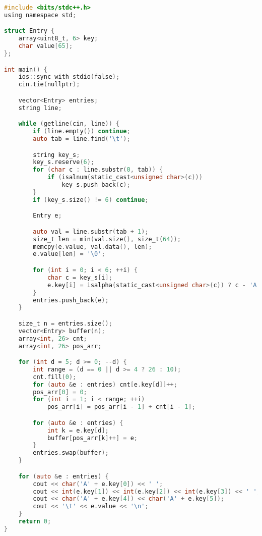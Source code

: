 \begin{lstlisting}[language=C]
	#include <bits/stdc++.h>
using namespace std;

struct Entry {
    array<uint8_t, 6> key;
    char value[65];
};

int main() {
    ios::sync_with_stdio(false);
    cin.tie(nullptr);

    vector<Entry> entries;
    string line;

    while (getline(cin, line)) {
        if (line.empty()) continue;
        auto tab = line.find('\t');

        string key_s;
        key_s.reserve(6);
        for (char c : line.substr(0, tab)) {
            if (isalnum(static_cast<unsigned char>(c)))
                key_s.push_back(c);
        }
        if (key_s.size() != 6) continue;

        Entry e;

        auto val = line.substr(tab + 1);
        size_t len = min(val.size(), size_t(64));
        memcpy(e.value, val.data(), len);
        e.value[len] = '\0';

        for (int i = 0; i < 6; ++i) {
            char c = key_s[i];
            e.key[i] = isalpha(static_cast<unsigned char>(c)) ? c - 'A' : c - '0';
        }
        entries.push_back(e);
    }

    size_t n = entries.size();
    vector<Entry> buffer(n);
    array<int, 26> cnt;
    array<int, 26> pos_arr;

    for (int d = 5; d >= 0; --d) {
        int range = (d == 0 || d >= 4 ? 26 : 10);
        cnt.fill(0);
        for (auto &e : entries) cnt[e.key[d]]++;
        pos_arr[0] = 0;
        for (int i = 1; i < range; ++i)
            pos_arr[i] = pos_arr[i - 1] + cnt[i - 1];

        for (auto &e : entries) {
            int k = e.key[d];
            buffer[pos_arr[k]++] = e;
        }
        entries.swap(buffer);
    }

    for (auto &e : entries) {
        cout << char('A' + e.key[0]) << ' ';
        cout << int(e.key[1]) << int(e.key[2]) << int(e.key[3]) << ' ';
        cout << char('A' + e.key[4]) << char('A' + e.key[5]);
        cout << '\t' << e.value << '\n';
    }
    return 0;
}

\end{lstlisting}

